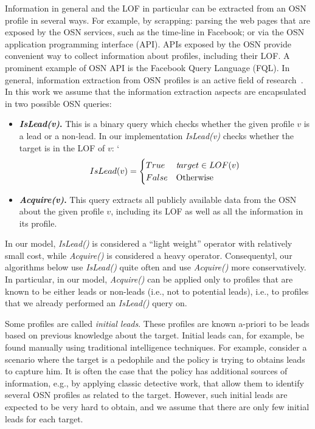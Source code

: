 \documentclass[journal]{IEEEtran}
\newcommand{\islead}[1]{{\em IsLead(#1)}}
\newcommand{\acquire}[1]{{\em Acquire(#1)}}
\newcommand{\target}{{\textit target}}
\begin{document}
Information in general and the LOF in particular can be extracted from an OSN profile in several ways. For example, by scrapping: parsing the web pages that are exposed by the OSN services, such as the time-line in Facebook; or via the OSN application programming interface (API). APIs exposed by the OSN provide convenient way to collect information about profiles, including their LOF. A prominent example of OSN API is the Facebook Query Language (FQL). 	
In general, information extraction from OSN profiles is an active field of research~\cite[inter alia]{tang2010aCombinationApproach,pawlas2012universal}.
In this work we assume that the information extraction aspects are encapsulated in two possible OSN queries: 
\begin{itemize}
\item {\bf \islead{v}.} This is a binary query which checks whether the given profile \(v\) is a lead or a non-lead. In our implementation \islead{v}  checks whether the target is in the LOF of $v$:
`
\begin{equation}
IsLead(v)=
\begin{cases} 
      True  & \target \in LOF(v) \\
      False & \text{Otherwise}
\end{cases}
\end{equation}
\item {\bf \acquire{v}.}  This query extracts all publicly available data from the OSN about the given profile \(v\), including its LOF as well as all the information in its profile.  
\end{itemize}

In our model, \islead{} is considered a ``light weight'' operator with relatively small cost, while \acquire{} is considered a heavy operator. 
Consequentyl, our algorithms below use \islead{} 
quite often and use \acquire{} more conservatively. In particular, in our model, \acquire{} can be applied only to profiles that are known to be either leads or non-leads (i.e., not to potential leads), i.e., to profiles that we already performed an \islead{} query on. 


Some profiles are called {\em initial leads}. These profiles are known a-priori to be leads based on previous knowledge about the target.  Initial leads can, for example, be found manually using traditional intelligence techniques. 
For example, consider a scenario where the target is a pedophile and the policy is trying to obtains leads to capture him. It is often the case that the policy has additional sources of information, e.g., by applying classic detective work, that allow them to identify several OSN profiles as related to the target. However, such initial leads are expected to be very hard to obtain, and we assume that there are only few initial leads for each target. 
\end{document}
